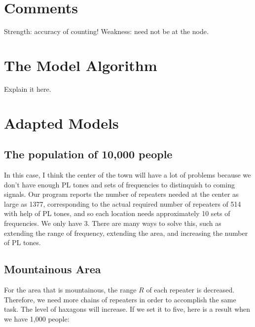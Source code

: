 \documentclass{icmmcm}
\begin{document}
\section{Comments}
Strength: accuracy of counting!
Weakness: need not be at the node.

\section{The Model Algorithm}
Explain it here.

\section{Adapted Models}
\subsection{The population of 10,000 people}
In this case, I think the center of the town will have a lot of problems because we don't have enough PL tones and sets of frequencies to distinquish to coming signals. Our program reports the number of repeaters needed at the center as large as 1377, corresponding to the actual required number of repeaters of 514 with help of PL tones, and so each location needs approximately 10 sets of frequencies. We only have 3. There are many ways to solve this, such as extending the range of frequency, extending the area, and increasing the number of PL tones.

\subsection{Mountainous Area}
For the area that is mountainous, the range $R$ of each repeater is decreased. Therefore, we need more chains of repeaters in order to accomplish the same task. The level of haxagons will increase. If we set it to five, here is a result when we have 1,000 people:
\end{document}
